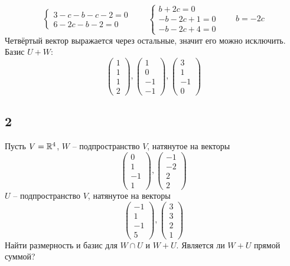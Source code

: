 \begin{itemize}
$$\begin{cases}
        3 - c - b - c - 2 = 0 \\
        6 - 2c - b - 2 = 0
    \end{cases} \qquad
    \begin{cases}
    	b + 2c = 0 \\
        -b - 2c + 1 = 0 \\
        -b - 2c + 4 = 0
    \end{cases} \qquad b = -2c $$
    Четвёртый вектор выражается через остальные, значит его можно исключить. Базис $ U + W $:
    $$
    \begin{pmatrix}
    	1 \\
        1 \\
        1 \\
        2
    \end{pmatrix},
    \begin{pmatrix}
    	1 \\
        0 \\
        -1 \\
        -1
    \end{pmatrix},
    \begin{pmatrix}
        3 \\
        1 \\
        -1 \\
        0
    \end{pmatrix} $$
\end{itemize}

\subsection{2}

Пусть $ V = \mathbb{R}^4 $, $ W $ -- подпространство $ V $, натянутое на векторы
$$
\begin{pmatrix}
	0 \\
    1 \\
    -1 \\
    1
\end{pmatrix},
\begin{pmatrix}
	-1 \\
    -2 \\
    2 \\
    2
\end{pmatrix} $$
$ U $ -- подпространство $ V $, натянутое на векторы
$$
\begin{pmatrix}
	-1 \\
    1 \\
    -1 \\
    5
\end{pmatrix},
\begin{pmatrix}
	3 \\
    3 \\
    2 \\
    1
\end{pmatrix} $$
Найти размерность и базис для $ W \cap U $ и $ W + U $. Является ли $ W + U $ прямой суммой?

